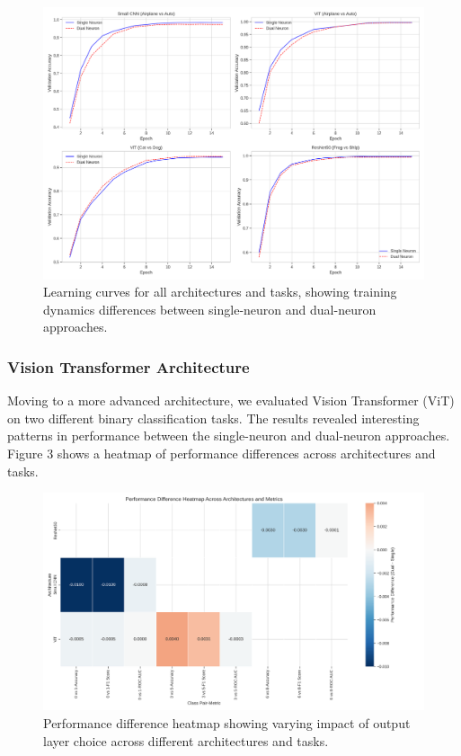 \documentclass[11pt]{article}
\begin{document}
\begin{figure}[htbp]
\centering
\includegraphics[width=\textwidth]{figures/learning_curves.png}
\caption{Learning curves for all architectures and tasks, showing training dynamics differences between single-neuron and dual-neuron approaches.}
\end{figure}

\subsubsection{Vision Transformer Architecture}
Moving to a more advanced architecture, we evaluated Vision Transformer (ViT) on two different binary classification tasks. The results revealed interesting patterns in performance between the single-neuron and dual-neuron approaches. Figure 3 shows a heatmap of performance differences across architectures and tasks.

\begin{figure}[htbp]
\centering
\includegraphics[width=\textwidth]{figures/performance_difference_heatmap.png}
\caption{Performance difference heatmap showing varying impact of output layer choice across different architectures and tasks.}
\end{figure}
\end{document}
